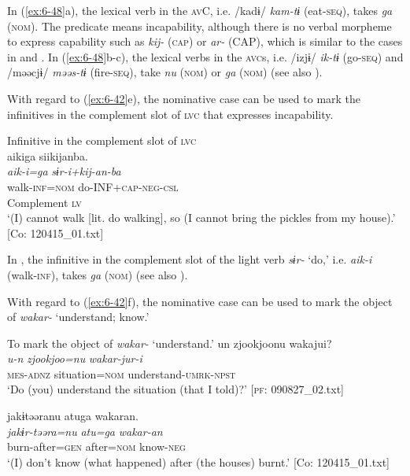In (\ref{ex:6-48}a), the lexical verb in the \textsc{av}C, i.e. /kadɨ/ \textit{kam-tɨ} (eat-\textsc{seq}), takes \textit{ga} (\textsc{nom}). The predicate means incapability, although there is no verbal morpheme to express capability such as \textit{kij-} (\textsc{cap}) or \textit{ar-} (CAP), which is similar to the cases in  and . In (\ref{ex:6-48}b-c), the lexical verbs in the \textsc{avc}s, i.e. /izjɨ/ \textit{ik-tɨ} (go-\textsc{seq}) and /məəcjɨ/ \textit{məəs-tɨ} (fire-\textsc{seq}), take \textit{nu} (\textsc{nom}) or \textit{ga} (\textsc{nom}) (see also ).

With regard to (\ref{ex:6-42}e), the nominative case can be used to mark the infinitives in the complement slot of \textsc{lvc} that expresses incapability.

\ea\label{ex:6-49}
 Infinitive in the complement slot of \textsc{lvc}\\

{\TM}
\gllll aikiga  siikijanba.\\
\textit{aik-i=ga}  \textit{sɨr-i+kij-an-ba}\\
    walk-\textsc{inf}=\textsc{nom}  do-INF+\textsc{cap}-\textsc{neg}-\textsc{csl}\\
    Complement  \textsc{lv}\\
\glt    ‘(I) cannot walk [lit. do walking], so (I cannot bring the pickles from my house).’
  [Co: 120415\_01.txt]
\z

In , the infinitive in the complement slot of the light verb \textit{sɨr-} ‘do,’ i.e. \textit{aik-i} (walk-\textsc{inf}), takes \textit{ga} (\textsc{nom}) (see also ).

  With regard to (\ref{ex:6-42}f), the nominative case can be used to mark the object of \textit{wakar-} ‘understand; know.’

\ea\label{ex:6-50}
  To mark the object of \textit{wakar-} ‘understand.’
 \ea {\TM}  un  {\textbar}zjookjoo{\textbar}nu  wakajui?\\
\glll \textit{u-n}  \textit{zjookjoo=nu}  \textit{wakar-jur-i}\\
\textsc{mes}-\textsc{adnz}  situation=\textsc{nom}  understand-\textsc{umrk}-\textsc{npst}\\
\glt ‘Do (you) understand the situation (that I told)?’ [\textsc{pf}: 090827\_02.txt]
\z

\ex {\TM}  jakɨtəəranu  atuga  wakaran.\\
\glll \textit{jakɨr-təəra=nu}  \textit{atu=ga}  \textit{wakar-an}\\
burn-after=\textsc{gen}  after=\textsc{nom}  know-\textsc{neg}\\
\glt ‘(I) don’t know (what happened) after (the houses) burnt.’ [Co: 120415\_01.txt]
\z


